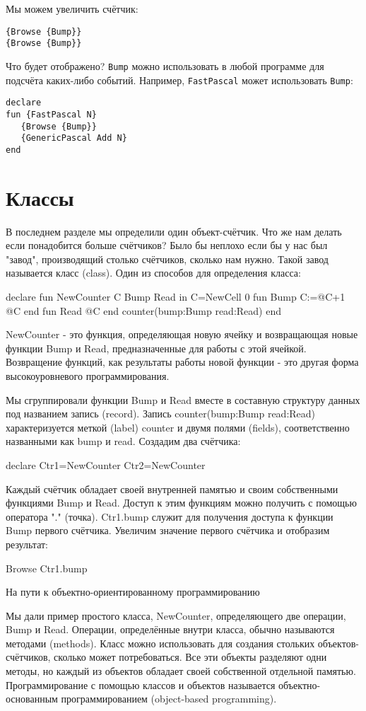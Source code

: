 Мы можем увеличить счётчик:

\begin{lstlisting}
{Browse {Bump}}
{Browse {Bump}}
\end{lstlisting}

Что будет отображено? \lstinline|Bump| можно использовать в любой программе для подсчёта каких-либо событий. Например, \lstinline|FastPascal| может использовать \lstinline|Bump|:

\begin{lstlisting}
declare
fun {FastPascal N}
   {Browse {Bump}}
   {GenericPascal Add N}
end
\end{lstlisting}

\section{Классы}

В последнем разделе мы определили один объект-счётчик. Что же нам делать если понадобится больше счётчиков? Было бы неплохо если бы у нас был "завод", производящий столько счётчиков, сколько нам нужно. Такой завод называется класс (class). Один из способов для определения класса:

declare
fun {NewCounter}
C Bump Read in
C={NewCell 0}
fun {Bump}
C:=@C+1
@C
end
fun {Read}
@C
end
counter(bump:Bump read:Read)
end

NewCounter - это функция, определяющая новую ячейку и возвращающая новые функции Bump и Read, предназначенные для работы с этой ячейкой. Возвращение функций, как результаты работы новой функции - это другая форма высокоуровневого программирования.

Мы сгруппировали функции Bump и Read вместе в составную структуру данных под названием запись (record). Запись counter(bump:Bump read:Read) характеризуется меткой (label) counter и двумя полями (fields), соответственно названными как bump и read. Создадим два счётчика:

declare
Ctr1={NewCounter}
Ctr2={NewCounter}

Каждый счётчик обладает своей внутренней памятью и своим собственными функциями Bump и Read. Доступ к этим функциям можно получить с помощью оператора "." (точка). Ctr1.bump служит для получения доступа к функции Bump первого счётчика. Увеличим значение первого счётчика и отобразим результат:

{Browse {Ctr1.bump}}

На пути к объектно-ориентированному программированию

Мы дали пример простого класса, NewCounter, определяющего две операции, Bump и Read. Операции, определённые внутри класса, обычно называются методами (methods). Класс можно использовать для создания стольких объектов-счётчиков, сколько может потребоваться. Все эти объекты разделяют одни методы, но каждый из объектов обладает своей собственной отдельной памятью. Программирование с помощью классов и объектов называется объектно-основанным программированием (object-based programming).

